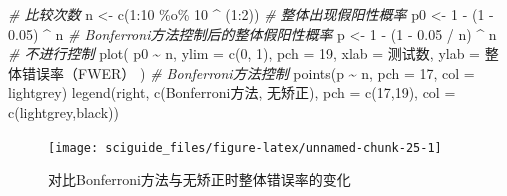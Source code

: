 \documentclass[]{tufte-book}
\newenvironment{Shaded}{}{}
\newcommand{\AttributeTok}[1]{\textcolor[rgb]{0.49,0.56,0.16}{#1}}
\newcommand{\CommentTok}[1]{\textcolor[rgb]{0.38,0.63,0.69}{\textit{#1}}}
\newcommand{\DecValTok}[1]{\textcolor[rgb]{0.25,0.63,0.44}{#1}}
\newcommand{\FloatTok}[1]{\textcolor[rgb]{0.25,0.63,0.44}{#1}}
\newcommand{\FunctionTok}[1]{\textcolor[rgb]{0.02,0.16,0.49}{#1}}
\newcommand{\NormalTok}[1]{#1}
\newcommand{\OtherTok}[1]{\textcolor[rgb]{0.00,0.44,0.13}{#1}}
\newcommand{\SpecialCharTok}[1]{\textcolor[rgb]{0.25,0.44,0.63}{#1}}
\newcommand{\StringTok}[1]{\textcolor[rgb]{0.25,0.44,0.63}{#1}}
\begin{document}
\begin{Shaded}
\begin{Highlighting}[]
\CommentTok{\# 比较次数}
\NormalTok{n }\OtherTok{\textless{}{-}} \FunctionTok{c}\NormalTok{(}\DecValTok{1}\SpecialCharTok{:}\DecValTok{10} \SpecialCharTok{\%o\%} \DecValTok{10} \SpecialCharTok{\^{}}\NormalTok{ (}\DecValTok{1}\SpecialCharTok{:}\DecValTok{2}\NormalTok{))}
\CommentTok{\# 整体出现假阳性概率}
\NormalTok{p0 }\OtherTok{\textless{}{-}} \DecValTok{1} \SpecialCharTok{{-}}\NormalTok{ (}\DecValTok{1} \SpecialCharTok{{-}} \FloatTok{0.05}\NormalTok{) }\SpecialCharTok{\^{}}\NormalTok{ n}
\CommentTok{\# Bonferroni方法控制后的整体假阳性概率}
\NormalTok{p }\OtherTok{\textless{}{-}} \DecValTok{1} \SpecialCharTok{{-}}\NormalTok{ (}\DecValTok{1} \SpecialCharTok{{-}} \FloatTok{0.05} \SpecialCharTok{/}\NormalTok{ n) }\SpecialCharTok{\^{}}\NormalTok{ n}
\CommentTok{\# 不进行控制}
\FunctionTok{plot}\NormalTok{(}
\NormalTok{  p0 }\SpecialCharTok{\textasciitilde{}}\NormalTok{ n,}
  \AttributeTok{ylim =} \FunctionTok{c}\NormalTok{(}\DecValTok{0}\NormalTok{, }\DecValTok{1}\NormalTok{),}
  \AttributeTok{pch =} \DecValTok{19}\NormalTok{,}
  \AttributeTok{xlab =} \StringTok{\textquotesingle{}测试数\textquotesingle{}}\NormalTok{,}
  \AttributeTok{ylab =} \StringTok{\textquotesingle{}整体错误率（FWER）\textquotesingle{}}
\NormalTok{)}
\CommentTok{\# Bonferroni方法控制}
\FunctionTok{points}\NormalTok{(p }\SpecialCharTok{\textasciitilde{}}\NormalTok{ n, }\AttributeTok{pch =} \DecValTok{17}\NormalTok{, }\AttributeTok{col =} \StringTok{\textquotesingle{}lightgrey\textquotesingle{}}\NormalTok{)}
\FunctionTok{legend}\NormalTok{(}\StringTok{\textquotesingle{}right\textquotesingle{}}\NormalTok{,}
       \FunctionTok{c}\NormalTok{(}\StringTok{\textquotesingle{}Bonferroni方法\textquotesingle{}}\NormalTok{, }\StringTok{\textquotesingle{}无矫正\textquotesingle{}}\NormalTok{),}
       \AttributeTok{pch =} \FunctionTok{c}\NormalTok{(}\DecValTok{17}\NormalTok{,}\DecValTok{19}\NormalTok{),}
       \AttributeTok{col =} \FunctionTok{c}\NormalTok{(}\StringTok{\textquotesingle{}lightgrey\textquotesingle{}}\NormalTok{,}\StringTok{\textquotesingle{}black\textquotesingle{}}\NormalTok{))}
\end{Highlighting}
\end{Shaded}

\begin{figure}
\texttt{[image: sciguide\_files/figure-latex/unnamed-chunk-25-1]} \caption[对比Bonferroni方法与无矫正时整体错误率的变化]{对比Bonferroni方法与无矫正时整体错误率的变化}\label{fig:unnamed-chunk-25}
\end{figure}
\end{document}
